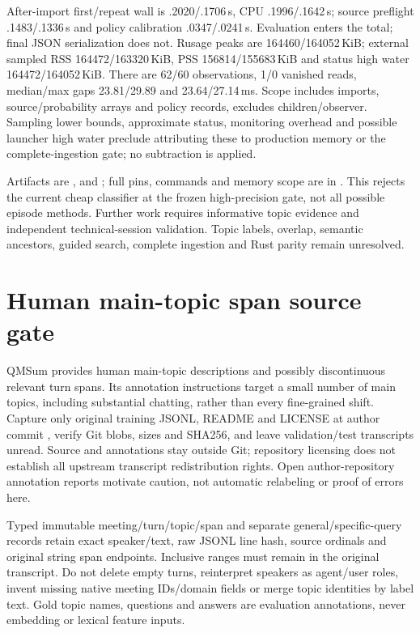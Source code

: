 \documentclass[11pt]{article}
\begin{document}
After-import first/repeat wall is .2020/.1706\,s, CPU .1996/.1642\,s; source
preflight .1483/.1336\,s and policy calibration .0347/.0241\,s. Evaluation enters
the total; final JSON serialization does not. Rusage peaks are
164460/164052\,KiB; external sampled RSS 164472/163320\,KiB, PSS
156814/155683\,KiB and status high water 164472/164052\,KiB. There are 62/60
observations, 1/0 vanished reads, median/max gaps 23.81/29.89 and
23.64/27.14\,ms. Scope includes imports, source/probability arrays and policy
records, excludes children/observer. Sampling lower bounds, approximate status,
monitoring overhead and possible launcher high water preclude attributing these
to production memory or the complete-ingestion gate; no subtraction is applied.

Artifacts are ,
 and
; full pins, commands and memory
scope are in . This
rejects the current cheap classifier at the frozen high-precision gate, not all
possible episode methods. Further work requires informative topic evidence and
independent technical-session validation. Topic labels, overlap, semantic
ancestors, guided search, complete ingestion and Rust parity remain unresolved.

\section{Human main-topic span source gate}
QMSum \cite{zhong2021qmsum} provides human main-topic descriptions and possibly
discontinuous relevant turn spans. Its annotation instructions target a small
number of main topics, including substantial chatting, rather than every
fine-grained shift. Capture only original training JSONL, README and LICENSE at
author commit , verify Git blobs,
sizes and SHA256, and leave validation/test transcripts unread. Source and
annotations stay outside Git; repository licensing does not establish all
upstream transcript redistribution rights. Open author-repository annotation
reports motivate caution, not automatic relabeling or proof of errors here.

Typed immutable meeting/turn/topic/span and separate general/specific-query
records retain exact speaker/text, raw JSONL line hash, source ordinals and
original string span endpoints. Inclusive ranges must remain in the original
transcript. Do not delete empty turns, reinterpret speakers as agent/user roles,
invent missing native meeting IDs/domain fields or merge topic identities by
label text. Gold topic names, questions and answers are evaluation annotations,
never embedding or lexical feature inputs.
\end{document}
